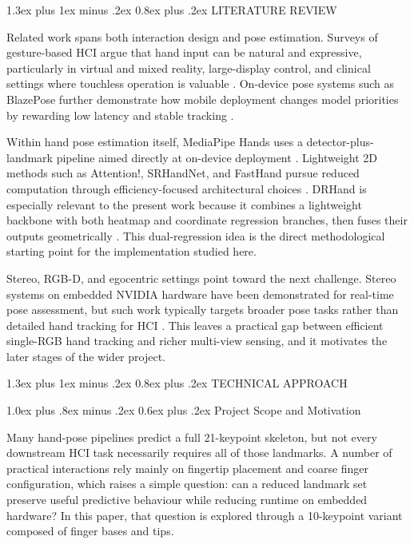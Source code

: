 \documentclass[10pt,letterpaper,twocolumn]{article}
\makeatletter
\renewcommand\section{\@startsection{section}{1}{\z@}%
  {1.3ex plus 1ex minus .2ex}%
  {0.8ex plus .2ex}%
  {\centering\normalfont\small\scshape}}
\renewcommand\subsection{\@startsection{subsection}{2}{\z@}%
  {1.0ex plus .8ex minus .2ex}%
  {0.6ex plus .2ex}%
  {\normalfont\itshape}}
\makeatother
\begin{document}
\section{LITERATURE REVIEW}

Related work spans both interaction design and pose estimation. Surveys of gesture-based HCI argue that hand input can be natural and expressive, particularly in virtual and mixed reality, large-display control, and clinical settings where touchless operation is valuable \cite{vuletic,wachs,li_vr}. On-device pose systems such as BlazePose further demonstrate how mobile deployment changes model priorities by rewarding low latency and stable tracking \cite{blazepose}.

Within hand pose estimation itself, MediaPipe Hands uses a detector-plus-landmark pipeline aimed directly at on-device deployment \cite{mediapipe}. Lightweight 2D methods such as Attention!, SRHandNet, and FastHand pursue reduced computation through efficiency-focused architectural choices \cite{attentionlite,srhandnet,fasthand}. DRHand is especially relevant to the present work because it combines a lightweight backbone with both heatmap and coordinate regression branches, then fuses their outputs geometrically \cite{dualreg}. This dual-regression idea is the direct methodological starting point for the implementation studied here.

Stereo, RGB-D, and egocentric settings point toward the next challenge. Stereo systems on embedded NVIDIA hardware have been demonstrated for real-time pose assessment, but such work typically targets broader pose tasks rather than detailed hand tracking for HCI \cite{stereojetson}. This leaves a practical gap between efficient single-RGB hand tracking and richer multi-view sensing, and it motivates the later stages of the wider project.

\section{TECHNICAL APPROACH}

\subsection{Project Scope and Motivation}

Many hand-pose pipelines predict a full 21-keypoint skeleton, but not every downstream HCI task necessarily requires all of those landmarks. A number of practical interactions rely mainly on fingertip placement and coarse finger configuration, which raises a simple question: can a reduced landmark set preserve useful predictive behaviour while reducing runtime on embedded hardware? In this paper, that question is explored through a 10-keypoint variant composed of finger bases and tips.
\end{document}
